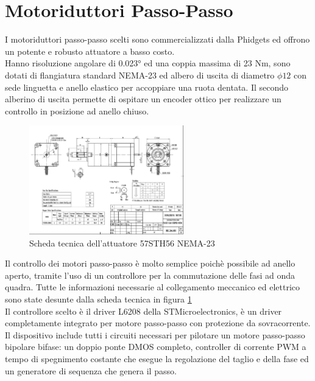 \documentclass[%
corpo=11pt,
twoside,
 stile=classica,
oldstyle,
greek,%
]{toptesi}
\begin{document}
	\section{Motoriduttori Passo-Passo}
	I motoriduttori passo-passo scelti sono commercializzati dalla Phidgets ed offrono un potente e robusto attuatore a basso costo. \\
	Hanno risoluzione angolare di 0.023° ed una coppia massima di 23 Nm, sono dotati di flangiatura standard NEMA-23 ed albero di uscita di diametro $\phi 12$ con sede linguetta e anello elastico per accoppiare una ruota dentata. 
	Il secondo alberino di uscita permette di ospitare un encoder ottico per realizzare un controllo in posizione ad anello chiuso.\\
		\begin{figure}
		\centering
		\includegraphics[width=0.6\textwidth]{Screen/STEPPER.png}
		\caption{Scheda tecnica dell'attuatore 57STH56 NEMA-23}
		\label{fig:Stepper}
	\end{figure}
	Il controllo dei motori passo-passo è molto semplice poichè possibile ad anello aperto, tramite l'uso di un controllore per la commutazione delle fasi ad onda quadra. Tutte le informazioni necessarie al collegamento meccanico ed elettrico sono state desunte dalla scheda tecnica in figura \ref{fig:Stepper} \\
	Il controllore scelto è il driver L6208 della STMicroelectronics, è un driver completamente integrato per motore passo-passo con protezione da sovracorrente. Il dispositivo include tutti i circuiti necessari per pilotare un motore passo-passo bipolare bifase: un doppio ponte DMOS completo, controller di corrente PWM a tempo di spegnimento costante che esegue la regolazione del taglio e della fase ed un generatore di sequenza che genera il passo. \\
	
\end{document}
